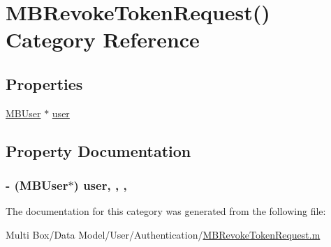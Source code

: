 \hypertarget{category_m_b_revoke_token_request_07_08}{\section{M\-B\-Revoke\-Token\-Request() Category Reference}
\label{category_m_b_revoke_token_request_07_08}
}
\subsection*{Properties}
\begin{DoxyCompactItemize}
\item 
\hyperlink{interface_m_b_user}{M\-B\-User} $\ast$ \hyperlink{category_m_b_revoke_token_request_07_08_ae8dc212338dc50b6c516604ef10ae664}{user}
\end{DoxyCompactItemize}


\subsection{Property Documentation}
\hypertarget{category_m_b_revoke_token_request_07_08_ae8dc212338dc50b6c516604ef10ae664}{
\subsubsection[{user}]{\setlength{\rightskip}{0pt plus 5cm}-\/ ({\bf M\-B\-User}$\ast$) user\hspace{0.3cm}{\ttfamily [read]}, {\ttfamily [write]}, {\ttfamily [nonatomic]}, {\ttfamily [strong]}}}\label{category_m_b_revoke_token_request_07_08_ae8dc212338dc50b6c516604ef10ae664}


The documentation for this category was generated from the following file\-:\begin{DoxyCompactItemize}
\item 
Multi Box/\-Data Model/\-User/\-Authentication/\hyperlink{_m_b_revoke_token_request_8m}{M\-B\-Revoke\-Token\-Request.\-m}\end{DoxyCompactItemize}
